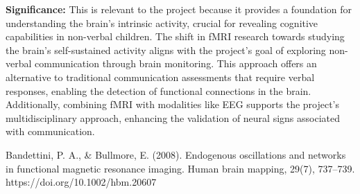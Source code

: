 \documentclass[12pt, research paper]{report}
\begin{document}
	\noindent \textbf{Significance:} This is relevant to the project because it provides a foundation for understanding the brain's intrinsic activity, crucial for revealing cognitive capabilities in non-verbal children. The shift in fMRI research towards studying the brain's self-sustained activity aligns with the project's goal of exploring non-verbal communication through brain monitoring. This approach offers an alternative to traditional communication assessments that require verbal responses, enabling the detection of functional connections in the brain. Additionally, combining fMRI with modalities like EEG supports the project's multidisciplinary approach, enhancing the validation of neural signs associated with communication. 
	\bigskip 
	
	\noindent Bandettini, P. A., \& Bullmore, E. (2008). Endogenous oscillations and networks in functional magnetic resonance imaging. Human brain mapping, 29(7), 737–739. https://doi.org/10.1002/hbm.20607
\end{document}
